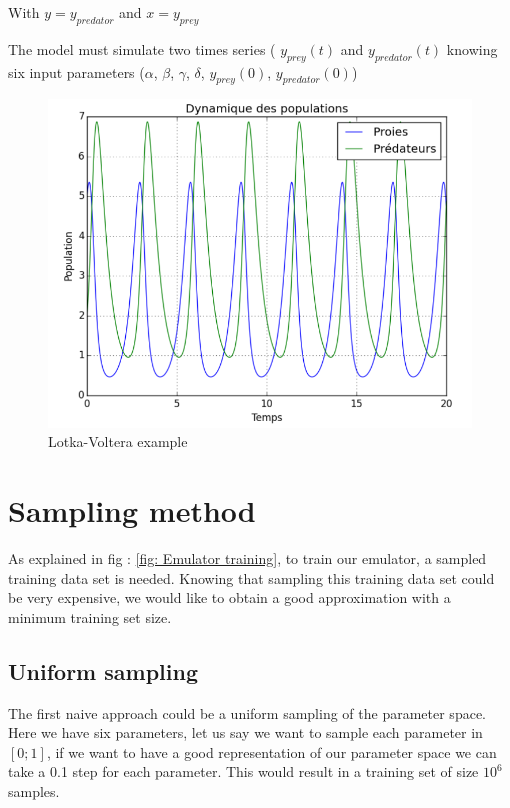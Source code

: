 \documentclass{article}
\begin{document}
With $y = y_{predator}$ and $x = y_{prey}$

The model must simulate two times series ( $y_{prey}(t)$ and $y_{predator}(t)$ knowing six input parameters ($\alpha$, $\beta$, $\gamma$, $\delta$, $y_{prey}(0)$, $y_{predator}(0)$)
\begin{figure}[H]
\centering
\includegraphics[scale=0.6]{image/lotka-volterra.png}
\caption{Lotka-Voltera example}
\label{fig: Lotka-Voltera example}
\end{figure}

\section{Sampling method}

As explained in fig : \ref{fig: Emulator training}, to train our emulator, a sampled training data set is needed. Knowing that sampling this training data set could be very expensive, we would like to obtain a good approximation with a minimum training set size. 


\subsection{Uniform sampling}
The first naive approach could be a uniform sampling of the parameter space. Here we have six parameters, let us say we want to sample each parameter in $[0;1]$, if we want to have a good representation of our parameter space we can take a 0.1 step for each parameter. 
This would result in a  training set of size $10^6$ samples.
\end{document}
